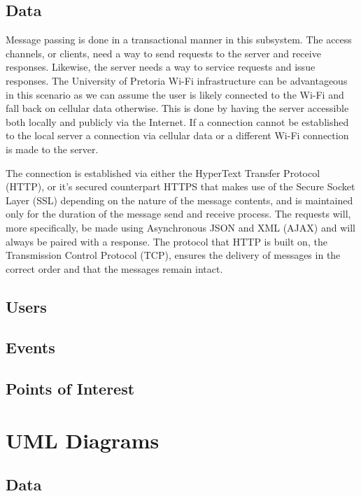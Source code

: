 \documentclass[11pt]{article}
\begin{document}
	\subsection{Data}
	Message passing is done in a transactional manner in this subsystem. The access channels, or clients, need a way to send requests to the server and receive responses. Likewise, the server needs a way to service requests and issue responses. The University of Pretoria Wi-Fi infrastructure can be advantageous in this scenario as we can assume the user is likely connected to the Wi-Fi and fall back on cellular data otherwise. This is done by having the server accessible both locally and publicly via the Internet. If a connection cannot be established to the local server a connection via cellular data or a different Wi-Fi connection is made to the server.
	
	The connection is established via either the HyperText Transfer Protocol (HTTP), or it's secured counterpart HTTPS that makes use of the Secure Socket Layer (SSL) depending on the nature of the message contents, and is maintained only for the duration of the message send and receive process. The requests will, more specifically, be made using Asynchronous JSON and XML (AJAX) and will always be paired with a response. The protocol that HTTP is built on, the Transmission Control Protocol (TCP), ensures the delivery of messages in the correct order and that the messages remain intact.
	\subsection{Users}
	\subsection{Events}
	\subsection{Points of Interest}
	
	\section{UML Diagrams}
	\subsection{Data}
\end{document}
